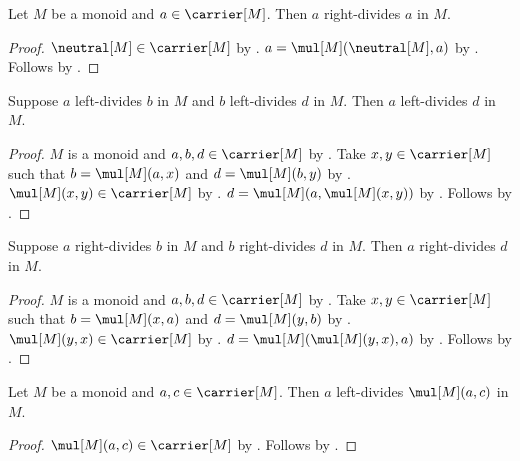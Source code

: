 \begin{proposition}\label{right_monoid_divisibility_reflexive}
    Let $M$ be a monoid and $a\in\carrier[M]$.
    Then $a$ right-divides $a$ in $M$.
\end{proposition}
\begin{proof}
    $\neutral[M]\in\carrier[M]$ by .
    $a=\mul[M](\neutral[M],a)$ by .
    Follows by .
\end{proof}

\begin{theorem}\label{left_monoid_divisibility_transitive}
    Suppose $a$ left-divides $b$ in $M$ and
        $b$ left-divides $d$ in $M$.
    Then $a$ left-divides $d$ in $M$.
\end{theorem}
\begin{proof}
    $M$ is a monoid and $a,b,d\in\carrier[M]$ by
        .
    Take $x,y\in\carrier[M]$ such that
        $b=\mul[M](a,x)$ and $d=\mul[M](b,y)$ by
        .
    $\mul[M](x,y)\in\carrier[M]$ by
        .
    $d=\mul[M](a,\mul[M](x,y))$ by
        .
    Follows by .
\end{proof}

\begin{theorem}\label{right_monoid_divisibility_transitive}
    Suppose $a$ right-divides $b$ in $M$ and
        $b$ right-divides $d$ in $M$.
    Then $a$ right-divides $d$ in $M$.
\end{theorem}
\begin{proof}
    $M$ is a monoid and $a,b,d\in\carrier[M]$ by
        .
    Take $x,y\in\carrier[M]$ such that
        $b=\mul[M](x,a)$ and $d=\mul[M](y,b)$ by
        .
    $\mul[M](y,x)\in\carrier[M]$ by
        .
    $d=\mul[M](\mul[M](y,x),a)$ by
        .
    Follows by .
\end{proof}

\begin{proposition}\label{left_monoid_divides_product}
    Let $M$ be a monoid and $a,c\in\carrier[M]$.
    Then $a$ left-divides $\mul[M](a,c)$ in $M$.
\end{proposition}
\begin{proof}
    $\mul[M](a,c)\in\carrier[M]$ by
        .
    Follows by .
\end{proof}

